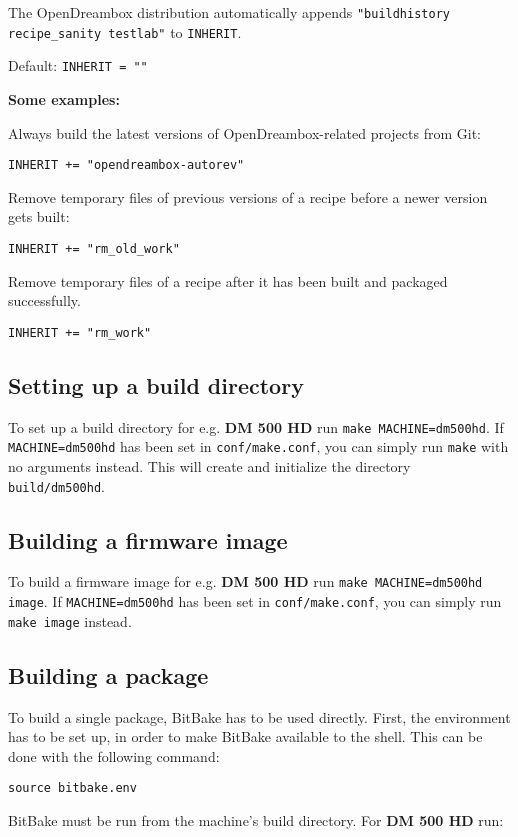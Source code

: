 \documentclass[a4paper]{article}
\newcommand{\shell}[1]{\texttt{\small #1}}
\begin{document}
       The OpenDreambox distribution automatically appends \shell{"buildhistory recipe\_sanity testlab"} to \shell{INHERIT}.

       Default: \shell{INHERIT = ""}

       \textbf{Some examples:}

       Always build the latest versions of OpenDreambox-related projects from Git:

       \shell{INHERIT += "opendreambox-autorev"}

       Remove temporary files of previous versions of a recipe before a newer version gets built:

       \shell{INHERIT += "rm\_old\_work"}

       Remove temporary files of a recipe after it has been built and packaged successfully.

       \shell{INHERIT += "rm\_work"}

  \subsection{Setting up a build directory}
     To set up a build directory for e.g. \textbf{DM 500 HD} run \shell{make MACHINE=dm500hd}. If
     \shell{MACHINE=dm500hd} has been set in \shell{conf/make.conf}, you can simply run \shell{make}
     with no arguments instead. This will create and initialize the directory \shell{build/dm500hd}.

  \subsection{Building a firmware image}
     To build a firmware image for e.g. \textbf{DM 500 HD} run \shell{make MACHINE=dm500hd image}.
     If \shell{MACHINE=dm500hd} has been set in \shell{conf/make.conf}, you can simply run
     \shell{make image} instead.

  \subsection{Building a package}
     To build a single package, BitBake has to be used directly. First, the environment
     has to be set up, in order to make BitBake available to the shell. This can be done
     with the following command:

     \shell{source bitbake.env}

     BitBake must be run from the machine's build directory. For \textbf{DM 500 HD} run:
\end{document}

